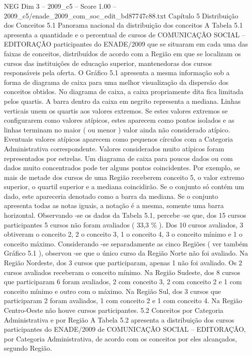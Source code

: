 \begin{textsample}{NEG Dim 3 – 2009\_c5 – Score 1.00 – 2009\_c5/enade\_2009\_com\_soc\_edit\_bd87747c88.txt}  \label{ex:f3_neg_106}
Capítulo 5 Distribuição dos Conceitos 5.1 Panorama nacional da distribuição dos conceitos A Tabela 5.1 apresenta a quantidade e o percentual de cursos de COMUNICAÇÃO SOCIAL – EDITORAÇÃO participantes do ENADE/2009 que se situaram em cada uma das faixas de conceitos, distribuídos de acordo com a Região em que se localizam os cursos das instituições de educação superior, mantenedoras dos cursos responsáveis pela oferta.
O Gráfico 5.1 apresenta a mesma informação sob a forma de diagrama de caixa para uma melhor visualização da dispersão dos conceitos obtidos.
No diagrama de caixa, a caixa propriamente dita fica limitada pelos quartis.
A barra dentro da caixa em negrito representa a mediana.
Linhas verticais unem os quartis aos valores extremos.
Se estes valores extremos se configurarem como valores atípicos, estes aparecem como pontos isolados e as linhas terminam no maior ( ou menor ) valor ainda não considerado atípico.
Eventuais valores atípicos aparecem como pequenos círculos com a Categoria Administrativa correspondente.
Valores considerados muito atípicos foram representados por estrelas.
Um diagrama de caixa para poucos dados ou com dados muito concentrados pode ter alguns pontos coincidentes.
Por exemplo, se mais de metade dos cursos de uma Região receberem conceito 5, o valor extremo superior, o quartil superior e a mediana coincidirão.
Se o conjunto só contém um dado, este apareceria denotado como a barra da mediana.
Se o conjunto apresenta todas as notas iguais, a notação é a mesma, somente uma barra horizontal.
Observando -se os dados da Tabela 5.1, percebe -se que, dos 15 cursos participantes 5 cursos não foram avaliados ( 33,3 \% ).
Dos 10 cursos avaliados, 3 obtiveram o conceito 2, 2 o conceito 3, 1 o conceito 4, 3 o conceito mínimo e 1 o conceito máximo.
Considerando -se separadamente as cinco Regiões ( ver também Gráfico 5.1 ), observou -se que o único curso da Região Norte não foi avaliado.
Na Região Nordeste, dos 3 cursos que participaram, apenas 1 não foi avaliado.
Os 2 cursos avaliados receberam o conceito mínimo.
Na Região Sudeste, dos 8 cursos que participaram 6 foram avaliados, 2 com conceito 3, 2 com conceito 2 e 1 com conceito mínimo e outro com o máximo.
Na Região Sul, dos 3 cursos que participaram 2 foram avaliados, 1 com conceito 2 e 1 com conceito 4.
Na Região Centro-Oeste não houve cursos participantes. 5.2 Conceitos por Categoria Administrativa e por Região A Tabela 5.2 apresenta a distribuição dos cursos participantes do ENADE/2009 de COMUNICAÇÃO SOCIAL – EDITORAÇÃO, por Categoria Administrativa, de acordo com os conceitos por eles alcançados, segundo Região.

\end{textsample}
